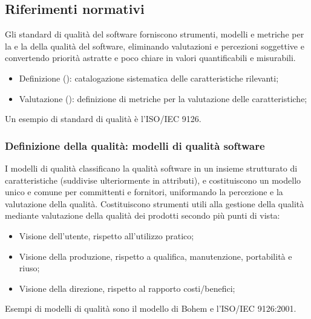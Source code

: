 \subsection{Riferimenti normativi}

Gli standard di qualità del software forniscono strumenti, modelli e metriche
per la  e la  della qualità del
software, eliminando valutazioni e percezioni soggettive e convertendo priorità
astratte e poco chiare in valori quantificabili e misurabili.

\begin{itemize}
  \item Definizione (): catalogazione sistematica
    delle caratteristiche rilevanti;
  \item Valutazione (): definizione di metriche per la
    valutazione delle caratteristiche;
\end{itemize}

Un esempio di standard di qualità è l'ISO/IEC 9126.

\subsubsection{Definizione della qualità: modelli di qualità software}

I modelli di qualità classificano la qualità software in un insieme strutturato
di caratteristiche (suddivise ulteriormente in attributi), e costituiscono un
modello unico e comune per committenti e fornitori, uniformando la percezione e
la valutazione della qualità. Costituiscono strumenti utili alla gestione della
qualità mediante valutazione della qualità dei prodotti secondo più punti di
vista:

\begin{itemize}
  \item Visione dell'utente, rispetto all'utilizzo pratico;
  \item Visione della produzione, rispetto a qualifica, manutenzione,
    portabilità e riuso;
  \item Visione della direzione, rispetto al rapporto costi/benefici;
\end{itemize}

Esempi di modelli di qualità sono il modello di Bohem e l'ISO/IEC 9126:2001.

